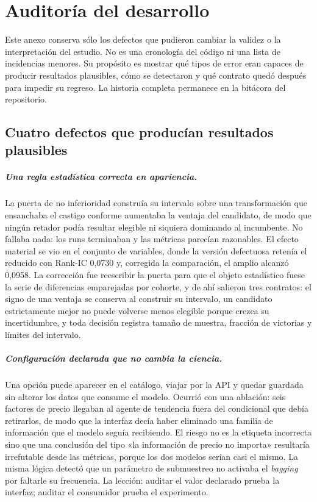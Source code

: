 \chapter{Auditoría del desarrollo}
\label{anexo:desarrollo}

Este anexo conserva sólo los defectos que pudieron cambiar la validez o la interpretación del
estudio. No es una cronología del código ni una lista de incidencias menores. Su propósito es
mostrar qué tipos de error eran capaces de producir resultados plausibles, cómo se detectaron y qué
contrato quedó después para impedir su regreso. La historia completa permanece en la bitácora del
repositorio.

{\footnotesize

}

\section{Cuatro defectos que producían resultados plausibles}

\paragraph{Una regla estadística correcta en apariencia.} La puerta de no inferioridad construía su
intervalo sobre una transformación que ensanchaba el castigo conforme aumentaba la ventaja del
candidato, de modo que ningún retador podía resultar elegible ni siquiera dominando al incumbente.
No fallaba nada: los runs terminaban y las métricas parecían razonables. El efecto material se vio
en el conjunto de variables, donde la versión defectuosa retenía el reducido con Rank-IC 0,0730 y,
corregida la comparación, el amplio alcanzó 0,0958. La corrección fue reescribir la puerta para que
el objeto estadístico fuese la serie de diferencias emparejadas por cohorte, y de ahí salieron tres
contratos: el signo de una ventaja se conserva al construir su intervalo, un candidato estrictamente
mejor no puede volverse menos elegible porque crezca su incertidumbre, y toda decisión registra
tamaño de muestra, fracción de victorias y límites del intervalo.

\paragraph{Configuración declarada que no cambia la ciencia.} Una opción puede aparecer en el
catálogo, viajar por la API y quedar guardada sin alterar los datos que consume el modelo. Ocurrió
con una ablación: seis factores de precio llegaban al agente de tendencia fuera del condicional que
debía retirarlos, de modo que la interfaz decía haber eliminado una familia de información que el
modelo seguía recibiendo. El riesgo no es la etiqueta incorrecta sino que una conclusión del tipo
«la información de precio no importa» resultaría irrefutable desde las métricas, porque los dos
modelos serían casi el mismo. La misma lógica detectó que un parámetro de submuestreo no activaba el
\textit{bagging} por faltarle su frecuencia. La lección: auditar el valor declarado prueba la
interfaz; auditar el consumidor prueba el experimento.

